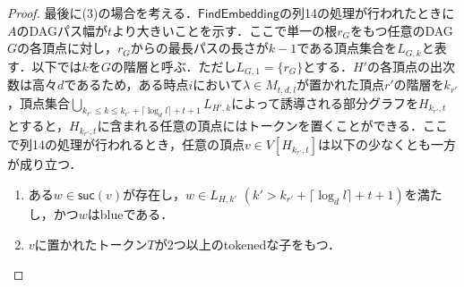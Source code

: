 \documentclass[master]{kuisthesis}		%
\theoremstyle{plain}
\theoremstyle{definition}
\begin{document}
\begin{proof}
最後に(3)の場合を考える．$\mathsf{FindEmbedding}$の列14の処理が行われたときに$A$のDAGパス幅が$t$より大きいことを示す．ここで単一の根$r_G$をもつ任意のDAG $G$の各頂点に対し，$r_G$からの最長パスの長さが$k-1$である頂点集合を$L_{G, k}$と表す．以下では$k$を$G$の階層と呼ぶ．ただし$L_{G, 1} = \{r_G\}$とする．$H'$の各頂点の出次数は高々$d$であるため，ある時点$i$において$\lambda \in M_{t, d, l}$が置かれた頂点$r'$の階層を$k_{r'}$，頂点集合$\bigcup_{k_{r'} \leq k \leq k_{r'}+ \lceil \log_d l \rceil +t+1} L_{H', k}$によって誘導される部分グラフを$H_{k_{r'}, t}$とすると，$H_{k_{r'}, t}$に含まれる任意の頂点にはトークンを置くことができる．ここで列14の処理が行われるとき，任意の頂点$v \in V[H_{k_{r'}, t}]$は以下の少なくとも一方が成り立つ．

\begin{enumerate}
    \item ある$w \in \mathsf{suc}(v)$が存在し，$w \in L_{H, k'}$ $(k' > k_{r'}+ \lceil \log_d l \rceil +t+1)$を満たし，かつ$w$はblueである． \label{cond1}
    \item $v$に置かれたトークン$T$が2つ以上のtokenedな子をもつ． \label{cond2}
\end{enumerate}


\end{proof}
\end{document}
